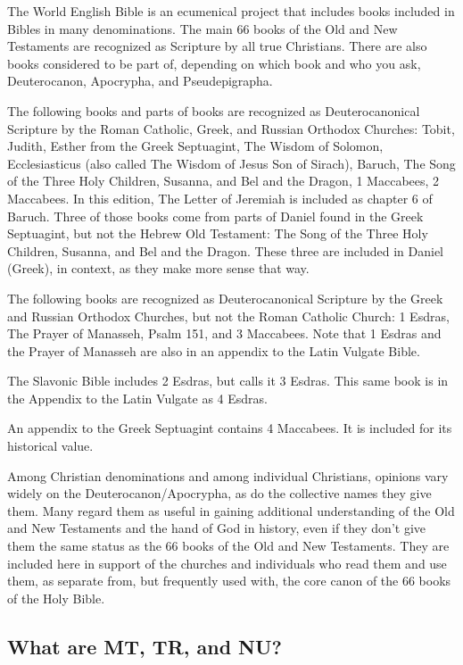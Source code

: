 The World English Bible is an ecumenical project that includes books
included in Bibles in many denominations. The main 66 books of the Old
and New Testaments are recognized as Scripture by all true Christians.
There are also books considered to be part of, depending on which book
and who you ask, Deuterocanon, Apocrypha, and Pseudepigrapha.

The following books and parts of books are recognized as
Deuterocanonical Scripture by the Roman Catholic, Greek, and Russian
Orthodox Churches: Tobit, Judith, Esther from the Greek Septuagint, The
Wisdom of Solomon, Ecclesiasticus (also called The Wisdom of Jesus Son
of Sirach), Baruch, The Song of the Three Holy Children, Susanna, and
Bel and the Dragon, 1 Maccabees, 2 Maccabees. In this edition, The
Letter of Jeremiah is included as chapter 6 of Baruch. Three of those
books come from parts of Daniel found in the Greek Septuagint, but not
the Hebrew Old Testament: The Song of the Three Holy Children, Susanna,
and Bel and the Dragon. These three are included in Daniel (Greek), in
context, as they make more sense that way.

The following books are recognized as Deuterocanonical Scripture by the
Greek and Russian Orthodox Churches, but not the Roman Catholic Church:
1 Esdras, The Prayer of Manasseh, Psalm 151, and 3 Maccabees. Note that
1 Esdras and the Prayer of Manasseh are also in an appendix to the Latin
Vulgate Bible.

The Slavonic Bible includes 2 Esdras, but calls it 3 Esdras. This same
book is in the Appendix to the Latin Vulgate as 4 Esdras.

An appendix to the Greek Septuagint contains 4 Maccabees. It is included
for its historical value.

Among Christian denominations and among individual Christians, opinions
vary widely on the Deuterocanon/Apocrypha, as do the collective names
they give them. Many regard them as useful in gaining additional
understanding of the Old and New Testaments and the hand of God in
history, even if they don't give them the same status as the 66 books of
the Old and New Testaments. They are included here in support of the
churches and individuals who read them and use them, as separate from,
but frequently used with, the core canon of the 66 books of the Holy
Bible.

\hypertarget{what-are-mt-tr-and-nu}{%
\subsection{What are MT, TR, and NU?}\label{what-are-mt-tr-and-nu}}


